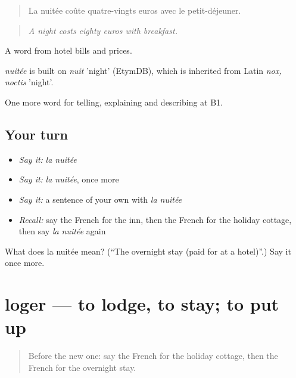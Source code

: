 \begin{quote}
La nuitée coûte quatre-vingts euros avec le petit-déjeuner.
\end{quote}

\begin{quote}
\emph{A night costs eighty euros with breakfast.}
\end{quote}

A word from hotel bills and prices.

\begin{cousinweb}
\emph{nuitée} is built on \emph{nuit} 'night' (EtymDB), which is inherited from Latin \emph{nox, noctis} 'night'.
\end{cousinweb}

\begin{grammarlens}[title={What you've built}]
One more word for telling, explaining and describing at B1.
\end{grammarlens}

\subsection*{Your turn}
\begin{itemize}
\raggedright
  \item \emph{Say it:} \emph{la nuitée}
  \item \emph{Say it:} \emph{la nuitée}, once more
  \item \emph{Say it:} a sentence of your own with \emph{la nuitée}
  \item \emph{Recall:} say the French for the inn, then the French for the holiday cottage, then say \emph{la nuitée} again
\end{itemize}

\begin{tcolorbox}[breakable,colback=teal!4,colframe=teal!35!black,title={Before you move on}]
What does la nuitée mean? (\textquotedblleft{}The overnight stay (paid for at a hotel)\textquotedblright{}.) Say it once more.
\end{tcolorbox}
\section[loger]{loger — to lodge, to stay; to put up}

\label{lesson:FR-C424-loger}



\begin{quote}
Before the new one: say the French for the holiday cottage, then the French for the overnight stay.
\end{quote}

